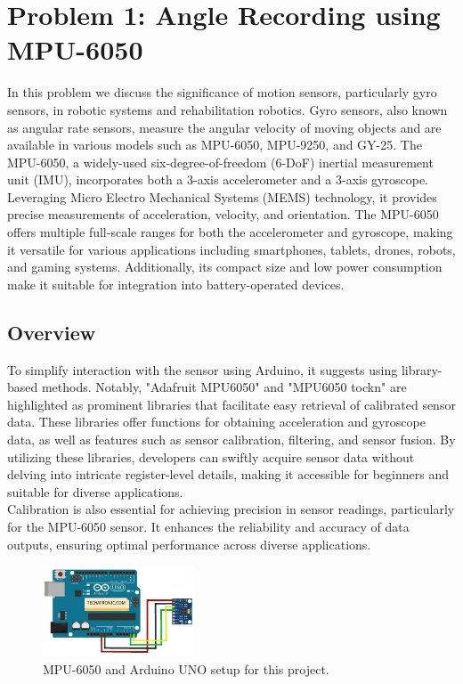 \documentclass[conference]{IEEEtran}
\begin{document}
\section{Problem 1: Angle Recording using MPU-6050}
In this problem we discuss the significance of motion sensors, particularly gyro sensors, in robotic systems and rehabilitation robotics. Gyro sensors, also known as angular rate sensors, measure the angular velocity of moving objects and are available in various models such as MPU-6050, MPU-9250, and GY-25. The MPU-6050, a widely-used six-degree-of-freedom (6-DoF) inertial measurement unit (IMU), incorporates both a 3-axis accelerometer and a 3-axis gyroscope. Leveraging Micro Electro Mechanical Systems (MEMS) technology, it provides precise measurements of acceleration, velocity, and orientation. The MPU-6050 offers multiple full-scale ranges for both the accelerometer and gyroscope, making it versatile for various applications including smartphones, tablets, drones, robots, and gaming systems. Additionally, its compact size and low power consumption make it suitable for integration into battery-operated devices.
\subsection{Overview}
To simplify interaction with the sensor using Arduino, it suggests using library-based methods. Notably, "Adafruit MPU6050" and "MPU6050 tockn" are highlighted as prominent libraries that facilitate easy retrieval of calibrated sensor data. These libraries offer functions for obtaining acceleration and gyroscope data, as well as features such as sensor calibration, filtering, and sensor fusion. By utilizing these libraries, developers can swiftly acquire sensor data without delving into intricate register-level details, making it accessible for beginners and suitable for diverse applications. \\
Calibration is also essential for achieving precision in sensor readings, particularly for the MPU-6050 sensor. It enhances the reliability and accuracy of data outputs, ensuring optimal performance across diverse applications.

\begin{figure}[htbp]
    \centerline{\includegraphics[width=0.4\textwidth]{figures/setup.jpeg}}
    \caption{MPU-6050 and Arduino UNO setup for this project.}
    \label{fig: setup}
\end{figure}
\end{document}
